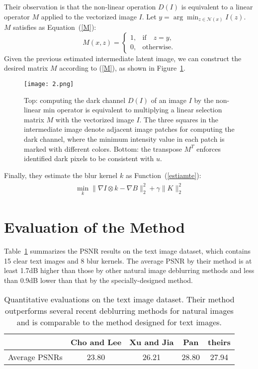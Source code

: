 \documentclass[twocolumn]{article}
\begin{document}
	Their observation is that the non-linear operation $D(I)$ is equivalent
	to a linear operator $M$ applied to the vectorized image $I$. Let $y=\arg \min_{z\in\mathcal{N}(x)}I(z)$. $M$ satisfies as Equation~(\ref{M}):
	\begin{equation}
	M(x,z)=
	\begin{cases}
	1, & \mbox{if} \quad z=y, \\
	0, & \mbox{otherwise}.
	\end{cases}      \label{M}
	\end{equation}
	Given the previous estimated intermediate latent image, we can construct the desired matrix $M$ according to (\ref{M}), as shown in Figure~\ref{fig2}.
	\begin{figure}[htbp] 
		\centering
		\texttt{[image: 2.png]} 
		\caption{Top: computing the dark channel $D(I)$ of an image $I$ by the non-linear min operator is equivalent to multiplying a linear selection matrix $M$ with the vectorized image $I$. The three squares in the intermediate image denote adjacent image patches for computing the dark channel, where the minimum intensity value in each patch is marked with different colors. Bottom: the transpose $M^T$ enforces identified dark pixels to be consistent with $u$.}\label{fig2}  
	\end{figure}
	Finally, they estimate the blur kernel $k$ as Function~(\ref{estiamte}):
	\begin{equation}
	\begin{aligned}
	\begin{split}
	\min_k \parallel \nabla I\otimes k-\nabla B \parallel_2^2+\gamma \parallel K \parallel_2^2 \label{estiamte}
	\end{split}
	\end{aligned}
	\end{equation}

 \section{Evaluation of the Method}
   Table~\ref{Quantitative} summarizes the PSNR results on the text image dataset\cite{Pan2014Deblurring}, which contains 15 clear text images and 8 blur kernels. The average PSNR by their method is at least 1.7dB higher than those by other natural image deblurring methods and less than 0.9dB lower than that by the specially-designed method.
   \begin{table}[h]
   	\centering
   	\caption{Quantitative evaluations on the text image dataset\cite{Pan2014Deblurring}. Their method outperforms several recent deblurring methods for natural images and is comparable to the method designed for text images.}\label{Quantitative}
   	\begin{tabular}{|p{1cm}|c|c|c|c|}
   		\hline
   		& Cho and Lee& Xu and Jia & Pan\cite{Pan2014Deblurring}& theirs\\
   		\hline
   		Average PSNRs  &23.80 &26.21& 28.80 &27.94\\
   		\hline
   	\end{tabular}
   \end{table}
  

	
\end{document}
